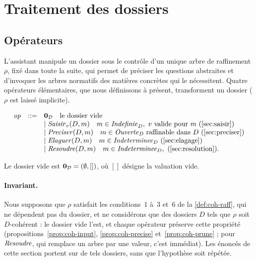 \documentclass[review]{jflart}
\begin{document}
\section{Traitement des dossiers}\label{sec:op}

\subsection{Opérateurs}\label{sec:operateurs}
L'assistant manipule un dossier sous le contrôle d'un unique arbre de
raffinement $\rho$, fixé dans toute la suite, qui permet de préciser les
questions abstraites et d'invoquer les arbres normatifs des matières concrètes
qui le nécessitent. Quatre opérateurs élémentaires, que nous définissons à présent, transforment un dossier ($\rho$ est laissé implicite).

\begin{defi}\label{def:operateurs}
\[
\begin{array}{lll}
\mathit{op} &::=& \EmptyD \quad \text{le dossier vide}\\
&& \mid \Input_v(D,m)\quad m\in\Undef_D,\ v \text{ valide pour } m\ (\text{\autoref{sec:saisir}})\\
&& \mid \Precise(D,m)\quad m\in\Ouverte_D \text{ raffinable dans } D\ (\text{\autoref{sec:preciser}})\\
&& \mid \Prune(D,m)\quad m\in\Indet_D\ (\text{\autoref{sec:elagage}})\\
&& \mid \Resolve(D,m)\quad m\in\Indet_D,\ (\text{\autoref{sec:resolution}}).
\end{array}
\]
\end{defi}

Le dossier vide est \(\mathbf{0}_{\mathcal{D}}=(\emptyset,[])\), où \([]\) désigne la valuation
vide.

\paragraph{Invariant.} Nous supposons que \(\rho\) satisfait les conditions~1
à~3 et~6 de la \autoref{def:coh-raff}, qui ne dépendent pas du dossier, et
ne considérons que des dossiers \(D\) tels que \(\rho\) soit \(D\)-cohérent :
le dossier vide l'est, et chaque opérateur préserve cette propriété
(propositions~\ref{prop:coh-input}, \ref{prop:coh-precise}
et~\ref{prop:coh-prune} ; pour \(\mathit{Resoudre}\), qui remplace un arbre par une
valeur, c'est immédiat). Les énoncés de cette section portent sur de tels
dossiers, sans que l'hypothèse soit répétée.
\end{document}
